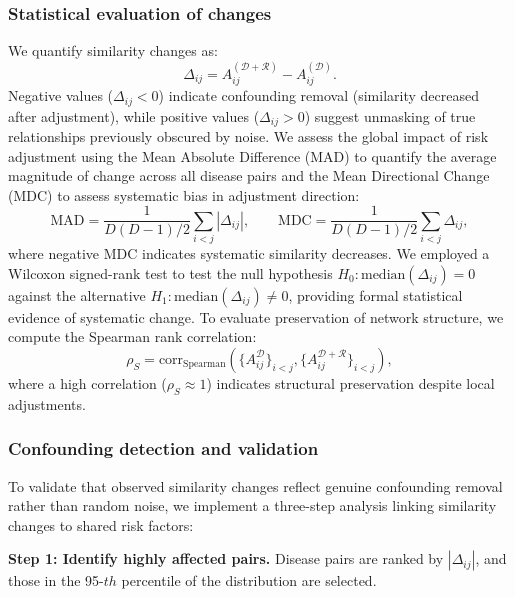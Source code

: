 \subsubsection{Statistical evaluation of changes}
We quantify similarity changes as:
\begin{equation}\label{eq:similarity_difference}
\Delta_{ij} = A_{ij}^{(\mathcal{D}+\mathcal{R})} - A_{ij}^{(\mathcal{D})}.
\end{equation}
Negative values ($\Delta_{ij} < 0$) indicate confounding removal (similarity decreased after adjustment), while positive values ($\Delta_{ij} > 0$) suggest unmasking of true relationships previously obscured by noise. We assess the global impact of risk adjustment using the Mean Absolute Difference (MAD) to quantify the average magnitude of change across all disease pairs and the Mean Directional Change (MDC) to assess systematic bias in adjustment direction: 
\begin{equation}
\text{MAD} = \frac{1}{D(D-1)/2} \sum_{i < j} |\Delta_{ij}|,\text{ } \text{ } \text{ } \text{MDC} = \frac{1}{D(D-1)/2} \sum_{i < j} \Delta_{ij},
\end{equation}
where negative MDC indicates systematic similarity decreases. We employed a Wilcoxon signed-rank test to test the null hypothesis $H_0: \text{median}(\Delta_{ij}) = 0$ against the alternative $H_1: \text{median}(\Delta_{ij}) \neq 0$, providing formal statistical evidence of systematic change. To evaluate preservation of network structure, we compute the Spearman rank correlation:
\begin{equation}
\rho_S = \text{corr}_{\text{Spearman}}(\{A_{ij}^{\mathcal{D}}\}_{i<j}, \{A_{ij}^{\mathcal{D+R}}\}_{i<j}),
\end{equation}
where a high correlation ($\rho_S \approx 1$) indicates structural preservation despite local adjustments.

\subsubsection{Confounding detection and validation}\label{subsub:conf_det}
To validate that observed similarity changes reflect genuine confounding removal rather than random noise, we implement a three-step analysis linking similarity changes to shared risk factors:

\textbf{Step 1: Identify highly affected pairs.} Disease pairs are ranked by $|\Delta_{ij}|$, and those in the 95-$th$ percentile of the distribution are selected.

